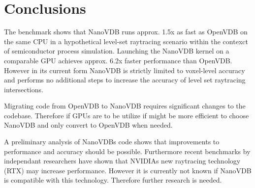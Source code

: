 \section{Conclusions}
The benchmark shows that NanoVDB runs approx. 1.5x as fast as OpenVDB on the same CPU in a hypothetical level-set raytracing scenario within the contexct of semiconductor process simulation.
Launching the NanoVDB kernel on a comparable GPU achieves approx. 6.2x faster performance than OpenVDB.
However in its current form NanoVDB is strictly limited to voxel-level accuracy and performs no additional steps to increase the accuracy of level set raytracing intersections.

Migrating code from OpenVDB to NanoVDB requires significant changes to the codebase.
Therefore if GPUs are to be utilize if might be more efficient to choose NanoVDB and only convert to OpenVDB when needed.

A preliminary analysis of NanoVDBs code shows that improvements to performance and accuracy should be possible.
Furthermore recent benchmarks by independant researchers have shown that NVIDIAs new raytracing technology (RTX) may increase performance.
However it is currently not known if NanoVDB is compatible with this technology.
Therefore further research is needed.
\printbibliography
